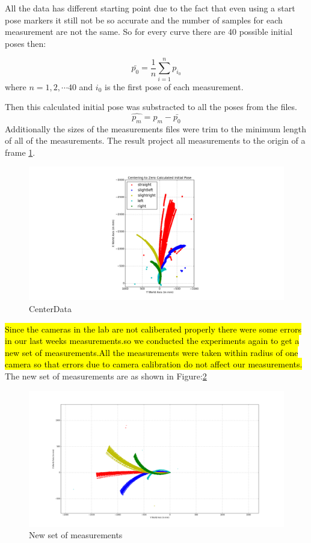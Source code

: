 \documentclass[10pt]{scrartcl}
\begin{document}
All the data has different starting point due to the fact that even using a start pose markers it still not be so accurate and the number of samples for each measurement are not the same. So for every curve there are 40 possible initial poses then:

\[	
	\bar{p_0} = \frac{1}{n} \sum_{i=1}^{n} p_{i_0}
\]
where $n = 1,2,\cdots 40$ and $i_0$ is the first pose of each measurement.

Then this calculated initial pose was substracted to all the poses from the files.
\[	
	\hat{p_m} = p_m - \bar{p_0}
\]
Additionally the sizes of the measurements files were trim to the minimum length of all of the measurements. The result project all measurements to the origin of a frame \ref{fig:preprocess}.

\begin{figure}[H]
\centering
\includegraphics[trim={220 0 0 0},clip,scale=0.5]{images/centerMeasurements}
\caption{CenterData}
\label{fig:preprocess}
\end{figure}

\hl{Since the cameras in the lab are not caliberated properly there were some errors in our last weeks measurements.so we conducted the experiments again to get a new set of measurements.All the measurements were taken within radius of one camera so that errors due to camera calibration do not affect our measurements. }
The new set of measurements are as shown in Figure:\ref{fig:OriginalData}

\begin{figure}[ht!]
\centering
\includegraphics[scale=0.25]{images/figure_1}
\caption{New set of measurements}
\label{fig:OriginalData}
\end{figure}
\end{document}

